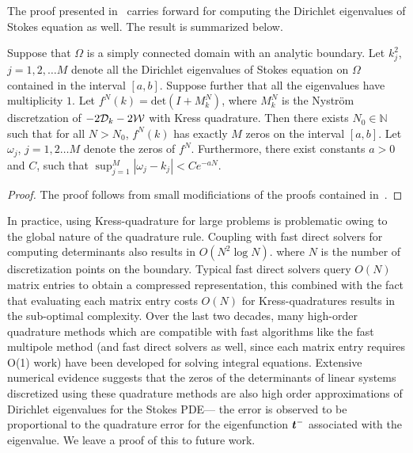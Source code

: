 The proof presented in~\cite{zhao2015robust} carries
forward for computing the Dirichlet eigenvalues of
Stokes equation as well.
The result is summarized below.
\begin{thrm}
\label{thm:mainconvfreddet}
Suppose that $\Omega$ is a simply connected
domain with an analytic boundary. Let $k_{j}^2$, $j=1,2,\ldots M$
denote all the Dirichlet eigenvalues of Stokes equation
on $\Omega$ contained in the interval $[a,b]$. 
Suppose further that all the eigenvalues have multiplicity $1$.
Let $f^{N}(k) = \text{det}(I+M^{N}_{k})$, where $M^{N}_{k}$ 
is the Nystr\"{o}m discretzation of $-2{\mathcal D}_{k} - 2{\mathcal W}$ with Kress
quadrature.
Then there exists $N_{0} \in \mathbb{N}$ such
that for all $N>N_{0}$, 
$f^{N}(k)$ has exactly $M$ zeros on the interval $[a,b]$.
Let $\omega_{j}$, $j=1,2\ldots M$ denote the zeros of $f^{N}$.
Furthermore, there exist constants $a>0$ and $C$, 
such that $\sup_{j=1}^{M} |\omega_{j} - k_{j}| < C e^{-aN}$.
\end{thrm}

\begin{proof}
  The proof follows from small modificiations of the
  proofs contained in~\cite{zhao2015robust}. 
\end{proof}

\begin{remark}
In practice, using Kress-quadrature for large
problems is problematic owing to the global
nature of the quadrature rule.
Coupling with fast direct solvers for computing determinants also results in $O(N^2 \log{N})$.
where $N$ is the number of discretization points on the boundary.
Typical fast direct solvers
query $O(N)$ matrix entries to obtain a compressed representation,
this combined with the fact that evaluating each matrix entry
costs $O(N)$ for Kress-quadratures results in the sub-optimal
complexity. 
Over the last two decades, many high-order quadrature methods which are compatible with
fast algorithms like the fast multipole method (and fast direct solvers as well, 
since each matrix entry requires O(1) work) have been developed for solving
integral equations.
Extensive numerical evidence suggests that the zeros of the 
determinants of linear systems discretized using 
these quadrature methods are also high order approximations of Dirichlet eigenvalues
for the Stokes PDE--- the error is observed to be proportional to the quadrature error
for the eigenfunction ${\boldsymbol t}^{-}$ associated with the eigenvalue.
We leave a proof of this to future work.
\end{remark}

